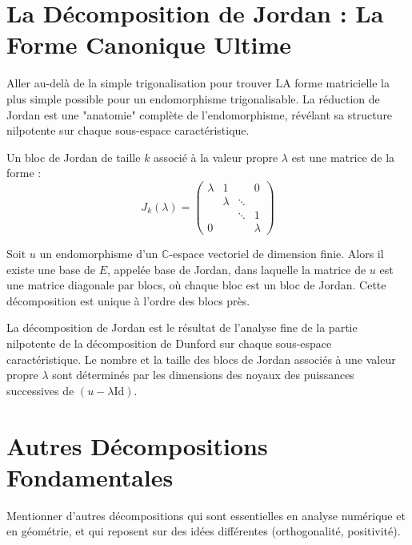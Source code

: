 \section{La Décomposition de Jordan : La Forme Canonique Ultime}

\begin{objectif}
    Aller au-delà de la simple trigonalisation pour trouver LA forme matricielle la plus simple possible pour un endomorphisme trigonalisable. La réduction de Jordan est une "anatomie" complète de l'endomorphisme, révélant sa structure nilpotente sur chaque sous-espace caractéristique.
\end{objectif}

\begin{definition}
    Un bloc de Jordan de taille $k$ associé à la valeur propre $\lambda$ est une matrice de la forme :
    $$ J_k(\lambda) = \begin{pmatrix} \lambda & 1 & & 0 \\ & \lambda & \ddots & \\ & & \ddots & 1 \\ 0 & & & \lambda \end{pmatrix} $$
\end{definition}

\begin{theorem}
    Soit $u$ un endomorphisme d'un $\mathbb{C}$-espace vectoriel de dimension finie. Alors il existe une base de $E$, appelée base de Jordan, dans laquelle la matrice de $u$ est une matrice diagonale par blocs, où chaque bloc est un bloc de Jordan.
    Cette décomposition est unique à l'ordre des blocs près.
\end{theorem}

\begin{remark}
    La décomposition de Jordan est le résultat de l'analyse fine de la partie nilpotente de la décomposition de Dunford sur chaque sous-espace caractéristique. Le nombre et la taille des blocs de Jordan associés à une valeur propre $\lambda$ sont déterminés par les dimensions des noyaux des puissances successives de $(u-\lambda \mathrm{Id})$.
\end{remark}

\section{Autres Décompositions Fondamentales}

\begin{objectif}
    Mentionner d'autres décompositions qui sont essentielles en analyse numérique et en géométrie, et qui reposent sur des idées différentes (orthogonalité, positivité).
\end{objectif}

